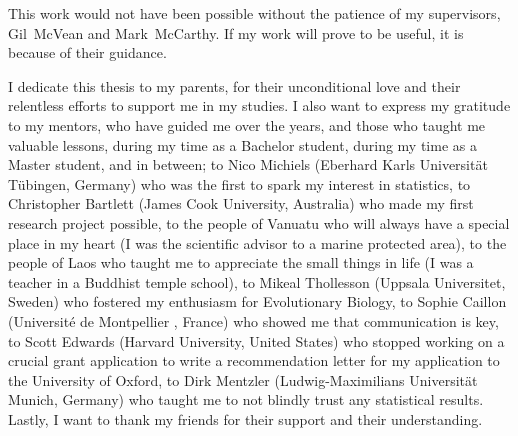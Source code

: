 


This work would not have been possible without the patience of my supervisors, Gil~McVean and Mark~McCarthy.
If my work will prove to be useful, it is because of their guidance.

I dedicate this thesis to my parents, for their unconditional love and their relentless efforts to support me in my studies.
I also want to express my gratitude to my mentors, who have guided me over the years, and those who taught me valuable lessons, during my time as a Bachelor student, during my time as a Master student, and in between;
to Nico Michiels (Eberhard Karls Universit\"at T\"ubingen, Germany) who was the first to spark my interest in statistics,
to Christopher Bartlett (James Cook University, Australia) who made my first research project possible,
to the people of Vanuatu who will always have a special place in my heart
(I was the scientific advisor to a marine protected area),
to the people of Laos who taught me to appreciate the small things in life
(I was a teacher in a Buddhist temple school),
to Mikeal Thollesson (Uppsala Universitet, Sweden) who fostered my enthusiasm for Evolutionary Biology,
to Sophie Caillon (Universit\'e de Montpellier , France) who showed me that communication is key,
to Scott Edwards (Harvard University, United States) who stopped working on a crucial grant application
to write a recommendation letter for my application to the University of Oxford,
to Dirk Mentzler (Ludwig-Maximilians Universit\"at Munich, Germany) who taught me to not blindly trust any statistical results.
Lastly, I want to thank my friends for their support and their understanding.




